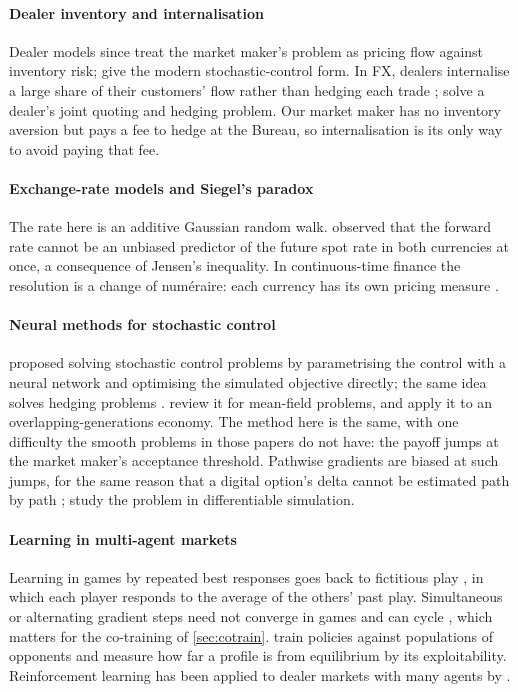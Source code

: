 \documentclass[11pt,a4paper]{article}
\theoremstyle{plain}
\theoremstyle{definition}
\newcommand{\1}{\mathbf{1}}
\begin{document}
\paragraph{Dealer inventory and internalisation}
Dealer models since \citet{ho1981} treat the market maker's problem as pricing flow against inventory risk; \citet{avellaneda2008} give the modern stochastic-control form. In FX, dealers internalise a large share of their customers' flow rather than hedging each trade \citep{butz2019}; \citet{barzykin2023} solve a dealer's joint quoting and hedging problem. Our market maker has no inventory aversion but pays a fee to hedge at the Bureau, so internalisation is its only way to avoid paying that fee.

\paragraph{Exchange-rate models and Siegel's paradox}
The rate here is an additive Gaussian random walk. \citet{siegel1972} observed that the forward rate cannot be an unbiased predictor of the future spot rate in both currencies at once, a consequence of Jensen's inequality. In continuous-time finance the resolution is a change of numéraire: each currency has its own pricing measure \citep{geman1995}.

\paragraph{Neural methods for stochastic control}
\citet{han2016} proposed solving stochastic control problems by parametrising the control with a neural network and optimising the simulated objective directly; the same idea solves hedging problems \citep{buehler2019}. \citet{carmona2023} review it for mean-field problems, and \citet{chen2025} apply it to an overlapping-generations economy. The method here is the same, with one difficulty the smooth problems in those papers do not have: the payoff jumps at the market maker's acceptance threshold. Pathwise gradients are biased at such jumps, for the same reason that a digital option's delta cannot be estimated path by path \citep{glasserman2004}; \citet{suh2022} study the problem in differentiable simulation.

\paragraph{Learning in multi-agent markets}
Learning in games by repeated best responses goes back to fictitious play \citep{brown1951}, in which each player responds to the average of the others' past play. Simultaneous or alternating gradient steps need not converge in games and can cycle \citep{balduzzi2018}, which matters for the co-training of \cref{sec:cotrain}. \citet{lanctot2017} train policies against populations of opponents and measure how far a profile is from equilibrium by its exploitability. Reinforcement learning has been applied to dealer markets with many agents by \citet{ganesh2019}.
\end{document}
